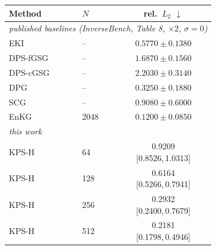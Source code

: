 \small
%
\begin{tabular}{llc}
\toprule
Method & $N$ & rel.\ $L_2$ $\downarrow$ \\
\midrule
\multicolumn{3}{l}{\emph{published baselines (InverseBench, Table 8, $\times 2$, $\sigma=0$)}} \\
EKI & -- & $0.5770 \pm 0.1380$ \\
DPS-fGSG & -- & $1.6870 \pm 0.1560$ \\
DPS-cGSG & -- & $2.2030 \pm 0.3140$ \\
DPG & -- & $0.3250 \pm 0.1880$ \\
SCG & -- & $0.9080 \pm 0.6000$ \\
EnKG & 2048 & $0.1200 \pm 0.0850$ \\
\midrule
\multicolumn{3}{l}{\emph{this work}} \\
\shortstack[l]{KPS-H\\\strut} & \shortstack{64\\\strut} & \shortstack{0.9209\\{\tiny[0.8526,\,1.0313]}} \\
\shortstack[l]{KPS-H\\\strut} & \shortstack{128\\\strut} & \shortstack{0.6164\\{\tiny[0.5266,\,0.7941]}} \\
\shortstack[l]{KPS-H\\\strut} & \shortstack{256\\\strut} & \shortstack{0.2932\\{\tiny[0.2400,\,0.7679]}} \\
\shortstack[l]{KPS-H\\\strut} & \shortstack{512\\\strut} & \shortstack{0.2181\\{\tiny[0.1798,\,0.4946]}} \\
\bottomrule
\end{tabular}
